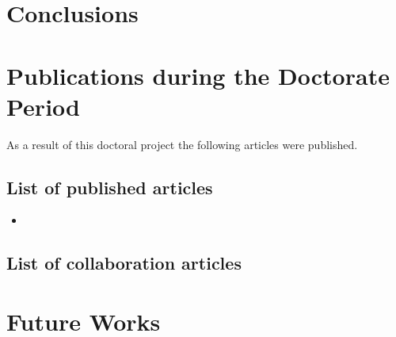 \section{Conclusions}

\section{Publications during the Doctorate Period}

As a result of this doctoral project the following articles were published.
\subsection{List of published articles}
\begin{itemize}
	\item \begin{NoHyper} \end{NoHyper}
\end{itemize}

\subsection{List of collaboration articles}
\begin{itemize}
\end{itemize}

\section{Future Works}
%
